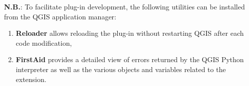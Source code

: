 
\textbf{N.B.}: To facilitate plug-in development, the following utilities can be installed from the QGIS application manager:
\begin{enumerate}
    \item \textbf{Reloader} allows reloading the plug-in without restarting QGIS after each code modification,
    \item \textbf{FirstAid} provides a detailed view of errors returned by the QGIS Python interpreter as well as the various objects and variables related to the extension.
\end{enumerate}
